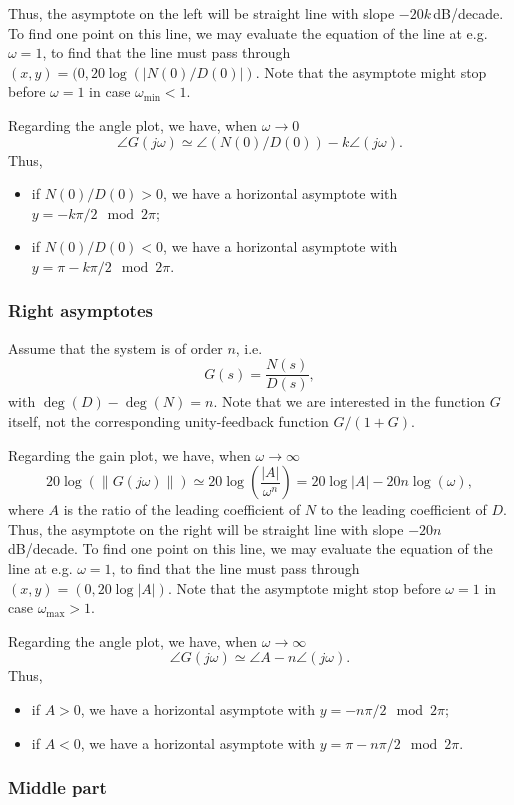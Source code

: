 \documentclass[a4paper,11pt]{report}
\theoremstyle{definition}
\begin{document}
Thus, the asymptote on the left will be straight line with slope
$-20k$\,dB/decade. To find one point on this line, we may evaluate
the equation of the line at e.g. $\omega=1$, to find that the line
must pass through $(x,y)=(0,20\log(|N(0)/D(0)|)$. Note that the
asymptote might stop before $\omega=1$ in case $\omega_{\min} < 1$.

Regarding the angle plot, we have, when $\omega\to 0$
\[
\angle G(j\omega) \simeq \angle(N(0)/D(0)) - k\angle(j\omega).
\]
Thus, 
\begin{itemize}
\item if $N(0)/D(0)>0$, we have a horizontal asymptote with
$y=-k\pi/2 \mod 2\pi$;
\item  if $N(0)/D(0)<0$, we have a horizontal asymptote with
$y=\pi-k\pi/2\mod 2\pi$.
\end{itemize}

\subsubsection{Right asymptotes}

Assume that the system is of order $n$, i.e.
\[
G(s) = \frac{N(s)}{D(s)},
\]
with $\deg(D)-\deg(N)=n$. Note that we are interested in the
function $G$ itself, not the corresponding unity-feedback function
$G/(1+G)$. 

Regarding the gain plot, we have, when $\omega\to \infty$
\[
20\log(\|G(j\omega)\|) \simeq
20\log\left(\frac{|A|}{\omega^n}\right)
= 20\log |A| - 20n\log(\omega),
\]
where $A$ is the ratio of the leading coefficient of $N$ to the
leading coefficient of $D$. Thus, the asymptote on the right will be
straight line with slope $-20n$\,dB/decade. To find one point on this
line, we may evaluate the equation of the line at e.g. $\omega=1$, to
find that the line must pass through $(x,y)=(0,20\log |A|)$. Note that
the asymptote might stop before $\omega=1$ in case $\omega_{\max} >
1$.

Regarding the angle plot, we have, when $\omega\to \infty$
\[
\angle G(j\omega) \simeq \angle A - n\angle(j\omega).
\]
Thus, 
\begin{itemize}
\item if $A>0$, we have a horizontal asymptote with
$y=-n\pi/2 \mod 2\pi$;
\item  if $A<0$, we have a horizontal asymptote with
$y=\pi-n\pi/2\mod 2\pi$.
\end{itemize}


\subsubsection{Middle part}
\end{document}
